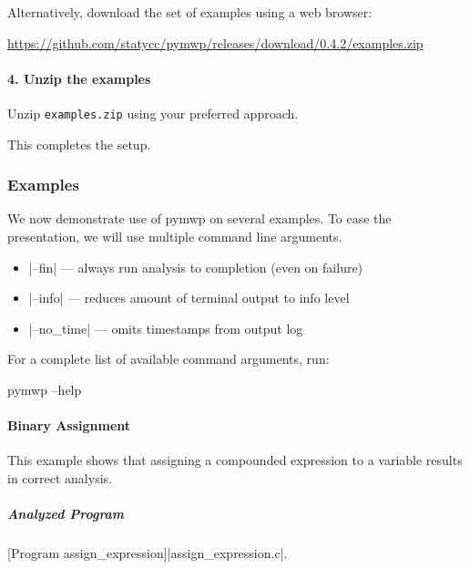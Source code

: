 Alternatively, download the set of examples using a web browser:

\url{https://github.com/statycc/pymwp/releases/download/0.4.2/examples.zip}

\paragraph*{4. Unzip the examples}
Unzip \texttt{examples.zip} using your preferred approach.

This completes the setup.

\subsubsection{Examples}\label{guide-examples}

We now demonstrate use of pymwp on several examples.
To ease the presentation, we will use multiple command line arguments.

\begin{itemize}
\item \pr|--fin| --- always run analysis to completion (even on failure)
\item \pr|--info| --- reduces amount of terminal output to info level
\item \pr|--no_time| --- omits timestamps from output log
\end{itemize}

For a complete list of available command arguments, run:

\begin{center}
\begin{minipage}{\textwidth}
\begin{cmdlisting}[label={lst:help-cmd}]
pymwp --help
\end{cmdlisting}
\end{minipage}
\end{center}

\paragraph{Binary Assignment}\label{binary-assignment}
This example shows that assigning a compounded expression to a variable results in correct analysis.

\subparagraph*{Analyzed Program}

\begin{center}
\begin{minipage}{\textwidth}
\captionsetup{type=lstlisting}
[Program assign\_expression]{\pr|assign\_expression.c|.}
\label{lst:assgn_exp}
\end{minipage}
\end{center}

